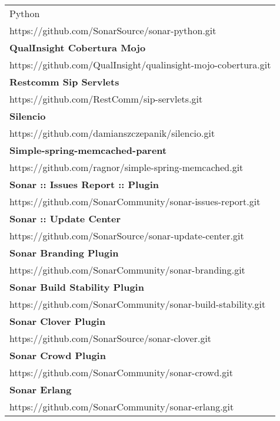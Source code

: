 \begin{table}[]
\begin{tabular}{|p{130mm}|}
Python                                             \\ https://github.com/SonarSource/sonar-python.git                              \\ \hline \bf
QualInsight Cobertura Mojo                         \\ https://github.com/QualInsight/qualinsight-mojo-cobertura.git                \\ \hline \bf
Restcomm Sip Servlets                              \\ https://github.com/RestComm/sip-servlets.git                                 \\ \hline \bf
Silencio                                           \\ https://github.com/damianszczepanik/silencio.git                             \\ \hline \bf
Simple-spring-memcached-parent                     \\ https://github.com/ragnor/simple-spring-memcached.git                        \\ \hline \bf
Sonar :: Issues Report :: Plugin                   \\ https://github.com/SonarCommunity/sonar-issues-report.git                    \\ \hline \bf
Sonar :: Update Center                             \\ https://github.com/SonarSource/sonar-update-center.git                       \\ \hline \bf
Sonar Branding Plugin                              \\ https://github.com/SonarCommunity/sonar-branding.git                         \\ \hline \bf 
Sonar Build Stability Plugin                       \\ https://github.com/SonarCommunity/sonar-build-stability.git                  \\ \hline \bf
Sonar Clover Plugin                                \\ https://github.com/SonarSource/sonar-clover.git                              \\ \hline \bf
Sonar Crowd Plugin                                 \\ https://github.com/SonarCommunity/sonar-crowd.git                            \\ \hline \bf
Sonar Erlang                                       \\ https://github.com/SonarCommunity/sonar-erlang.git                           \\ \hline

\end{tabular}
\end{table}

